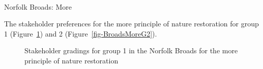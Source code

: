 \documentclass[
  12pt,
  letterpaper,
  DIV=11,
  numbers=noendperiod]{scrartcl}
\makeatletter
\let\oldparagraph\paragraph
\renewcommand{\paragraph}{
    \@ifstar
      \xxxParagraphStar
      \xxxParagraphNoStar
  }
\newcommand{\xxxParagraphStar}[1]{\oldparagraph*{#1}\mbox{}}
\newcommand{\xxxParagraphNoStar}[1]{\oldparagraph{#1}\mbox{}}
\makeatother
\begin{document}
\newpage{}

\paragraph{Norfolk Broads: More}\label{norfolk-broads-more}

The stakeholder preferences for the more principle of nature restoration
for group 1 (Figure~\ref{fig-BroadsMoreG1}) and 2
(Figure~\ref{fig-BroadsMoreG2}).

\begin{figure}[H]


\caption{\label{fig-BroadsMoreG1}Stakeholder gradings for group 1 in the
Norfolk Broads for the more principle of nature restoration}

\end{figure}%
\end{document}
